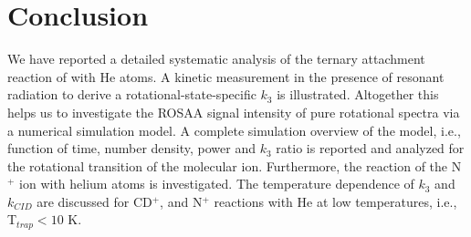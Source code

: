 \section{Conclusion}
\label{sec:CD+_conclusion}

We have reported a detailed systematic analysis of the ternary attachment reaction of \CD with He atoms. A kinetic 
measurement in the presence of resonant radiation to derive a rotational-state-specific $k_3$ is illustrated. 
Altogether this helps us to investigate the ROSAA signal intensity of pure rotational spectra via a numerical 
simulation model. 
A complete simulation overview of the model, i.e., function of time, number density, power and $k_3$ ratio is reported 
and analyzed for the \CDline rotational transition of the \CD molecular ion. Furthermore, the reaction of the N$^+$ ion 
with helium atoms is investigated. The temperature dependence of $k_3$ and $k_{CID}$ are discussed for CD$^+$, and N$^+$ 
reactions with He at low temperatures, i.e., T$_{trap}<10$ K.
